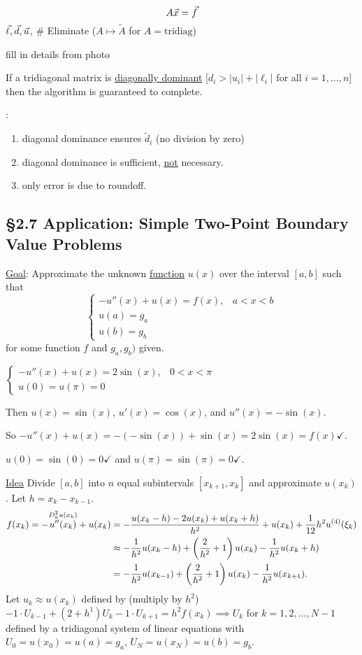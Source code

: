 \documentclass[]{article}
\begin{document}
\begin{theorem}
	$$ A\vec{x} = \vec{f}$$
	$\vec\ell, \vec{d},\vec{u}$, 
	\# Eliminate ($A\mapsto\tilde A$ for $A= \text{tridiag}$)
\end{theorem}

fill in details from photo

\begin{theorem}
	If a tridiagonal matrix is \ul{diagonally dominant} [$d_i>|u_i|+|\ell_i|$ for all $i=1,\dots,n$] then the algorithm is guaranteed to complete.
\end{theorem}
\begin{note}:
	\begin{enumerate}
		\item diagonal dominance ensures $\tilde d_i$ (no division by zero)
		\item diagonal dominance is sufficient, \ul{\ul{not}} necessary.
		\item only error is due to roundoff.
	\end{enumerate}
\end{note}

\subsection*{\S2.7 Application: Simple Two-Point Boundary Value Problems}

\ul{Goal}: Approximate the unknown \ul{function} $u(x)$ over the interval $[a,b]$ such that
$$ \begin{cases} -u''(x) + u(x) = f(x), & a<x<b \\ u(a) = g_a \\ u(b) = g_b \end{cases} $$
for some function $f$ and $g_a,g_b)$ given.
\begin{example}
	$\begin{cases} -u''(x)+u(x)=2\sin(x), & 0<x<\pi \\ u(0)=u(\pi)=0 \end{cases} $
	
	Then $u(x) = \sin(x)$, $u'(x) = \cos(x)$, and $u''(x)=-\sin(x)$.
	
	So $-u''(x)+u(x) = -(-\sin(x))+\sin(x) = 2\sin(x) = f(x) \checkmark$.
	
	$u(0)=\sin(0)=0\checkmark$ and $u(\pi)=\sin(\pi)=0\checkmark$.
\end{example}
\ul{Idea} Divide $[a,b]$ into $n$ equal subintervals $[x_{k+1},x_k]$ and approximate $u(x_k)$.
Let $h=x_k-x_{k-1}$.
\begin{align*}
	f(x_k) = -\overset{D_h^2u(x_k)}{u''(x_k)} + u(x_k) 
		   &= -\frac{u(x_k-h)-2u(x_k)+u(x_k+h)}{h^2} + u(x_k) + \frac1{12}h^2 u^{(4)}(\xi_k) \\
		   &\approx -\frac1{h^2}u(x_k-h) + \left(\frac2{h^2}+1\right)u(x_k) - \frac1{h^2}u(x_k+h) \\
		   &= -\frac1{h^2}u(x_{k-1}) + \left(\frac2{h^2}+1\right)u(x_k) - \frac1{h^2}u(x_{k+1}).
\end{align*}
Let $u_k \approx u(x_k)$ defined by (multiply by $h^2$)
$ -1\cdot U_{k-1} + (2+h^1)U_k-1\cdot U_{k+1} = h^2f(x_k) \implies U_k$ for $k=1,2,\dots,N-1$ defined by a tridiagonal system of linear equations with $U_0=u(x_0)=u(a)=g_a$, $U_N=u(x_N)=u(b)=g_b$.
\end{document}
